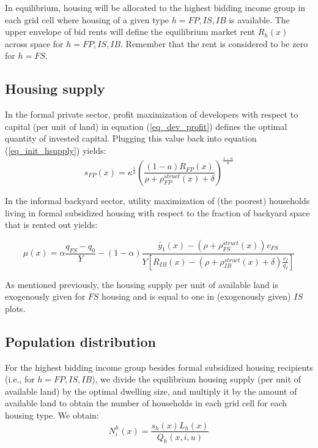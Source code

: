 \documentclass[12pt]{article}
\begin{document}

In equilibrium, housing will be allocated to the highest bidding income group in each grid cell where housing of a given type $h=FP,IS,IB$ is available. The upper envelope of bid rents will define the equilibrium market rent $R_h(x)$ across space for $h=FP,IS,IB$. Remember that the rent is considered to be zero for $h=FS$.

\subsection{Housing supply}

In the formal private sector, profit maximization of developers with respect to capital (per unit of land) in equation (\ref{eq_dev_profit}) defines the optimal quantity of invested capital. Plugging this value back into equation (\ref{eq_init_hsupply}) yields:
\begin{equation}
\label{eq_hsupply}
    s_{FP}(x) = \kappa^{\frac{1}{a}} \left(\frac{(1-a)R_{FP}(x)}{\rho + \rho_{FP}^{struct}(x) + \delta}\right)^{\frac{1-a}{a}}
\end{equation}

In the informal backyard sector, utility maximization of (the poorest) households living in formal subsidized housing with respect to the fraction of backyard space that is rented out yields:

\begin{equation}
    \mu(x) = \alpha \frac{q_{FS}-q_{0}}{Y} - (1-\alpha) \frac{\widetilde{y_{1}}(x) - \left(\rho + \rho_{FS}^{struct}(x)\right) v_{FS}}{Y\left[R_{IB}(x) - (\rho + \rho_{IB}^{struct}(x) + \delta)\frac{v_{I}}{q_{I}}\right]}
\end{equation}

As mentioned previously, the housing supply per unit of available land is exogenously given for $FS$ housing and is equal to one in (exogenously given) $IS$ plots.

\subsection{Population distribution \label{sec:eq_pop_dist}}

For the highest bidding income group besides formal subsidized housing recipients (i.e., for $h=FP,IS,IB$), we divide the equilibrium housing supply (per unit of available land) by the optimal dwelling size, and multiply it by the amount of available land to obtain the number of households in each grid cell for each housing type. We obtain:
\begin{equation}
\label{eq_nb_hh}
    N_i^h(x) = \frac{s_h(x)L_h(x)}{Q_h(x,i,u)}
\end{equation}
\end{document}
